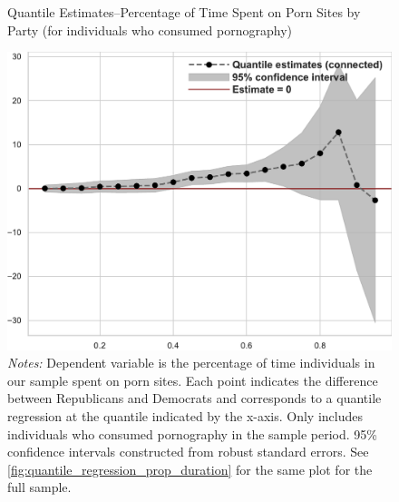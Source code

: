\documentclass[12pt, letterpaper]{article}
\begin{document}
\begin{figure}[ht]
	\centering
	\caption{Quantile Estimates--Percentage of Time Spent on Porn Sites by Party (for individuals who consumed pornography)}
	\includegraphics[width=.55\linewidth]{../figs/quantile_reg_nonzero_proportion_duration_adult.pdf}
	\caption*{\footnotesize \emph{Notes:} 
		Dependent variable is the percentage of time individuals in our sample spent on porn sites.
		Each point indicates the difference between Republicans and Democrats and corresponds to a quantile regression at the quantile indicated by the x-axis.
		Only includes individuals who consumed pornography in the sample period.
		95\% confidence intervals constructed from robust standard errors.
		See \cref{fig:quantile_regression_prop_duration} for the same plot for the full sample.
	}
	\label{fig:quantile_regression_prop_duration_nonzeroes}
\end{figure}
\end{document}
